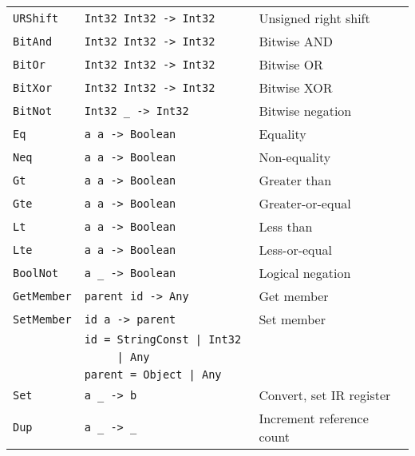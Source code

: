\begin{table}
\begin{tabular}{l | l | l}
        \texttt{URShift}     & \texttt{Int32  Int32 -> Int32    } &  Unsigned right shift       \\
        \texttt{BitAnd}      & \texttt{Int32  Int32 -> Int32    } &  Bitwise AND                \\
        \texttt{BitOr}       & \texttt{Int32  Int32 -> Int32    } &  Bitwise OR                 \\
        \texttt{BitXor}      & \texttt{Int32  Int32 -> Int32    } &  Bitwise XOR                \\
        \texttt{BitNot}      & \texttt{Int32  \_    -> Int32    } &  Bitwise negation           \\\hline
        \texttt{Eq}          & \texttt{a      a     -> Boolean  } &  Equality                   \\
        \texttt{Neq}         & \texttt{a      a     -> Boolean  } &  Non-equality               \\
        \texttt{Gt}          & \texttt{a      a     -> Boolean  } &  Greater than               \\
        \texttt{Gte}         & \texttt{a      a     -> Boolean  } &  Greater-or-equal           \\
        \texttt{Lt}          & \texttt{a      a     -> Boolean  } &  Less than                  \\
        \texttt{Lte}         & \texttt{a      a     -> Boolean  } &  Less-or-equal              \\
        \texttt{BoolNot}     & \texttt{a      \_    -> Boolean  } &  Logical negation           \\\hline
        \texttt{GetMember}   & \texttt{parent id    -> Any      } &  Get member                 \\
        \texttt{SetMember}   & \texttt{id     a     -> parent   } &  Set member                 \\
                             & \texttt{id = StringConst | Int32 } &                             \\
                             & \texttt{~~~~~| Any                 } &                             \\
                             & \texttt{parent = Object | Any    } &                             \\\hline
        \texttt{Set}         & \texttt{a      \_    -> b        } &  Convert, set IR register   \\
        \texttt{Dup}         & \texttt{a      \_    -> \_       } &  Increment reference count  \\

\end{tabular}
\end{table}
